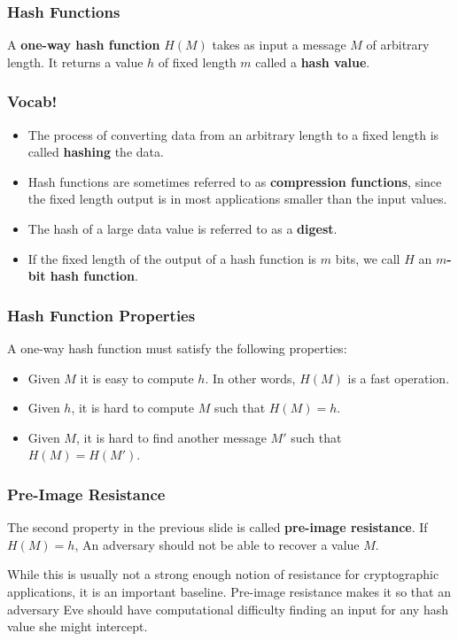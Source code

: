 \documentclass{beamer}
\newcommand{\<}{\langle}
\renewcommand{\>}{\rangle}
\begin{document}
\begin{frame}
\frametitle{Hash Functions}

A \textbf{one-way hash function} $H(M)$ takes as input a message $M$ of arbitrary length. It returns a value $h$ of fixed length $m$ called a \textbf{hash value}.
\end{frame}

\begin{frame}
\frametitle{Vocab!}

\begin{itemize}
\item The process of converting data from an arbitrary length to a fixed length is called \textbf{hashing} the data.
\item Hash functions are sometimes referred to as \textbf{compression functions}, since the fixed length output is in most applications smaller than the input values.
\item The hash of a large data value is referred to as a \textbf{digest}.
\item If the fixed length of the output of a hash function is $m$ bits, we call $H$ an \textbf{$m$-bit hash function}.
\end{itemize}
\end{frame}


\begin{frame}
\frametitle{Hash Function Properties}

A one-way hash function must satisfy the following properties:
\begin{itemize}
\item Given $M$ it is easy to compute $h$. In other words, $H(M)$ is a fast operation.
\item Given $h$, it is hard to compute $M$ such that $H(M) = h$.
\item Given $M$, it is hard to find another message $M'$ such that $H(M) = H(M')$.
\end{itemize}
\end{frame}

\begin{frame}
\frametitle{Pre-Image Resistance}

The second property in the previous slide is called \textbf{pre-image resistance}. If $H(M) = h$, An adversary should not be able to recover a value $M$. \newline

While this is usually not a strong enough notion of resistance for cryptographic applications, it is an important baseline. Pre-image resistance makes it so that an adversary Eve should have computational difficulty finding an input for any hash value she might intercept. 
\end{frame}
\end{document}
